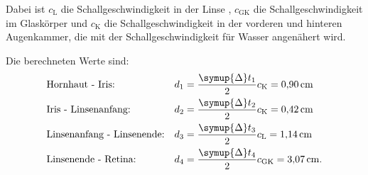 Dabei ist $c_\text{L}$ die Schallgeschwindigkeit in der Linse \cite[6]{sample}, $c_\text{GK}$ die Schallgeschwindigkeit im Glaskörper \cite[6]{sample}
und $c_\text{K}$ die Schallgeschwindigkeit in der vorderen und hinteren Augenkammer, die mit der Schallgeschwindigkeit für Wasser \cite{sample3}
angenähert wird.

Die berechneten Werte sind:
\begin{align*}
  &\text{Hornhaut - Iris:} &d_1 &= \frac{\symup{\Delta}t_1}{2} c_\text{K} = \SI{0,90}{\cm} \\
  &\text{Iris - Linsenanfang:} &d_2 &= \frac{\symup{\Delta}t_2}{2} c_\text{K} = \SI{0,42}{\cm} \\
  &\text{Linsenanfang - Linsenende:} &d_3 &= \frac{\symup{\Delta}t_3}{2} c_\text{L} = \SI{1,14}{\cm} \\
  &\text{Linsenende - Retina:} &d_4 &= \frac{\symup{\Delta}t_4}{2} c_\text{GK} = \SI{3,07}{\cm}.
\end{align*}
